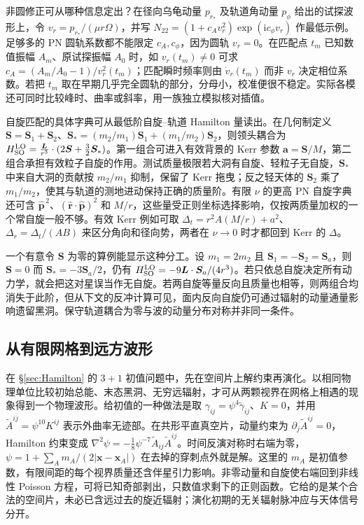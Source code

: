 非圆修正可从哪种信息定出？在径向乌龟动量 $p_{r_*}$ 及轨道角动量 $p_\phi$ 给出的试探波形上，令 $v_r=p_{r_*}/(\mu r\Omega)$，并写 $N_{22}=(1+c_A v_r^2)\exp(\mathrm i c_\phi v_r)$ 作最低示例。足够多的 PN 圆轨系数都不能限定 $c_A,c_\phi$，因为圆轨 $v_r=0$。在匹配点 $t_m$ 已知数值振幅 $A_m$、原试探振幅 $A_0$ 时，如 $v_r(t_m)\ne0$ 可求 $c_A=(A_m/A_0-1)/v_r^2(t_m)$；匹配瞬时频率则由 $\dot v_r(t_m)$ 而非 $v_r$ 决定相位系数。若把 $t_m$ 取在早期几乎完全圆轨的部分，分母小，校准便很不稳定。实际各模还可同时比较峰时、曲率或斜率，用一族独立模拟核对插值。

自旋匹配的具体字典可从最低阶自旋--轨道 Hamilton 量读出。在几何制定义 $\bm S=\bm S_1+\bm S_2$、$\bm S_*=(m_2/m_1)\bm S_1+(m_1/m_2)\bm S_2$，则领头耦合为 $H_{\rm SO}^{\rm LO}=\frac{\bm L}{r^3}\cdot (2\bm S+\tfrac32\bm S_*)$。第一组合可进入有效背景的 Kerr 参数 $\bm a=\bm S/M$，第二组合承担有效粒子自旋的作用。测试质量极限若大洞有自旋、轻粒子无自旋，$\bm S_*$ 中来自大洞的贡献按 $m_2/m_1$ 抑制，保留了 Kerr 拖曳；反之轻天体的 $\bm S_2$ 乘了 $m_1/m_2$，使其与轨道的测地进动保持正确的质量阶。有限 $\nu$ 的更高 PN 自旋字典还可含 $\hat{\bm p}^{\,2}$、$(\hat{\bm r}\cdot\hat{\bm p})^2$ 和 $M/r$，这些量受正则坐标选择影响，仅按两质量加权的一个常自旋一般不够。有效 Kerr 例如可取 $\Delta_t=r^2 A(M/r)+a^2$、$\Delta_r=\Delta_t/(AB)$ 来区分角向和径向势，两者在 $\nu\to0$ 时才都回到 Kerr 的 $\Delta$。

一个有意令 $\bm S$ 为零的算例能显示这种分工。设 $m_1=2m_2$ 且 $\bm S_1=-\bm S_2=\bm S_a$，则 $\bm S=0$ 而 $\bm S_*=-3\bm S_a/2$，仍有 $H_{\rm SO}^{\rm LO}=-9\bm L\cdot\bm S_a/(4r^3)$。若只依总自旋决定所有动力学，就会把这对星误当作无自旋。若两自旋等量反向且质量也相等，则两组合均消失于此阶，但从下文的反冲计算可见，面内反向自旋仍可通过辐射的动量通量影响遗留黑洞。保守轨道耦合为零与波的动量分布对称并非同一条件。

\subsection{从有限网格到远方波形}

在 \S\ref{sec:Hamilton} 的 $3+1$ 初值问题中，先在空间片上解约束再演化。以相同物理单位比较初始总能、末态黑洞、无穷远辐射，才可从两颗视界在网格上相遇的现象得到一个物理波形。给初值的一种做法是取 $\gamma_{ij}=\psi^4\tilde\gamma_{ij}$、$K=0$，并用 $\tilde A^{ij}=\psi^{10}K^{ij}$ 表示外曲率无迹部。在共形平直真空片，动量约束为 $\partial_j\tilde A^{ij}=0$，Hamilton 约束变成 $\nabla^2\psi=-\tfrac18\psi^{-7}\tilde A_{ij}\tilde A^{ij}$。时间反演对称时右端为零，$\psi=1+\sum_A m_A/(2|\bm x-\bm x_A|)$ 在去掉的穿刺点外就是解。这里的 $m_A$ 是初值参数，有限间距的每个视界质量还含伴星引力影响。非零动量和自旋使右端回到非线性 Poisson 方程，可将已知奇部剥出，只数值求剩下的正则函数。它给的是某个合法的空间片，未必已含远过去的旋近辐射；演化初期的无关辐射脉冲应与天体信号分开。

